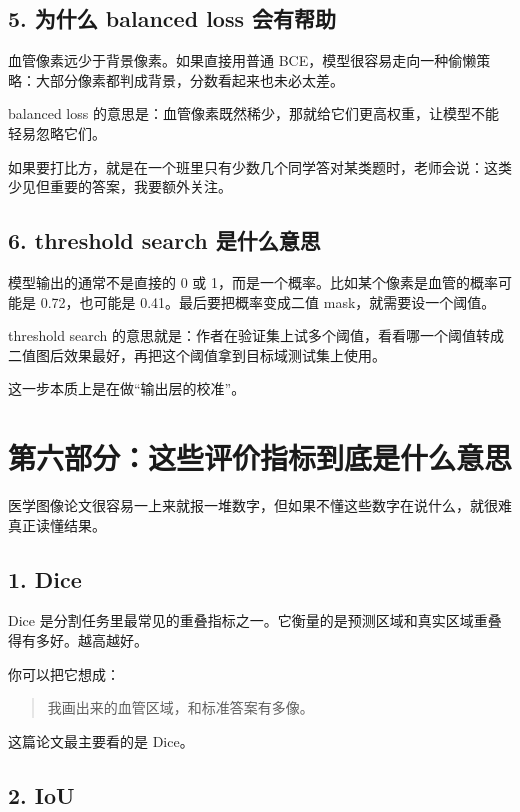 \documentclass[12pt,a4paper]{ctexart}
\begin{document}
\subsection*{5. 为什么 balanced loss 会有帮助}

血管像素远少于背景像素。如果直接用普通 BCE，模型很容易走向一种偷懒策略：大部分像素都判成背景，分数看起来也未必太差。

balanced loss 的意思是：血管像素既然稀少，那就给它们更高权重，让模型不能轻易忽略它们。

如果要打比方，就是在一个班里只有少数几个同学答对某类题时，老师会说：这类少见但重要的答案，我要额外关注。

\subsection*{6. threshold search 是什么意思}

模型输出的通常不是直接的 0 或 1，而是一个概率。比如某个像素是血管的概率可能是 0.72，也可能是 0.41。最后要把概率变成二值 mask，就需要设一个阈值。

threshold search 的意思就是：作者在验证集上试多个阈值，看看哪一个阈值转成二值图后效果最好，再把这个阈值拿到目标域测试集上使用。

这一步本质上是在做“输出层的校准”。

\section*{第六部分：这些评价指标到底是什么意思}

医学图像论文很容易一上来就报一堆数字，但如果不懂这些数字在说什么，就很难真正读懂结果。

\subsection*{1. Dice}

Dice 是分割任务里最常见的重叠指标之一。它衡量的是预测区域和真实区域重叠得有多好。越高越好。

你可以把它想成：

\begin{quote}
我画出来的血管区域，和标准答案有多像。
\end{quote}

这篇论文最主要看的是 Dice。

\subsection*{2. IoU}
\end{document}
